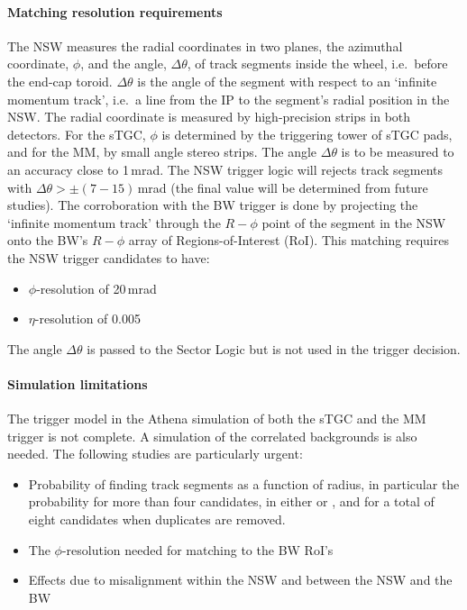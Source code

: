 \paragraph{Matching resolution requirements}
The NSW measures the radial coordinates in two planes, the azimuthal coordinate, $\phi$, and the angle, $\Delta\theta$, of track segments inside the wheel, i.e.\ before the end-cap toroid. $\Delta\theta$ is the angle of the segment with respect to an ‘infinite momentum track’, i.e.\ a line from the IP to the segment’s radial position in the NSW. The radial coordinate is measured by high-precision strips in both detectors. For the sTGC, $\phi$ is determined by the triggering tower of sTGC pads, and for the MM, by small angle stereo strips. The angle $\Delta\theta$ is to be measured to an accuracy close to 1\,mrad. The NSW trigger logic will rejects track segments with $\Delta\theta > \pm (7-15)$\,mrad (the final value will be determined from future studies).
The corroboration with the BW trigger is done by projecting the ‘infinite momentum track’ through the $R-\phi$ point of the segment in the NSW onto the BW’s $R-\phi$ array of Regions-of-Interest (RoI).
This matching requires the NSW trigger candidates to have:
\begin{itemize}\itemsep-6pt
\item $\phi$-resolution of 20\,mrad
\item $\eta$-resolution of 0.005
\end{itemize}
The angle $\Delta\theta$ is passed to the Sector Logic but is not used in the \PhaseOne trigger decision.

\paragraph{Simulation limitations}
The trigger model in the Athena simulation of both the sTGC and the MM trigger is not complete. A simulation of the correlated backgrounds is also needed. The following studies are particularly urgent:
\begin{itemize}\itemsep-4pt
\item Probability of finding track segments as a function of radius, in particular the probability for more than four candidates, in either \MM or \stgc, and for a total of eight candidates when duplicates are removed.
\item The $\phi$-resolution needed for matching to the BW RoI’s
\item Effects due to misalignment within the NSW and between the NSW and the BW
\end{itemize}


